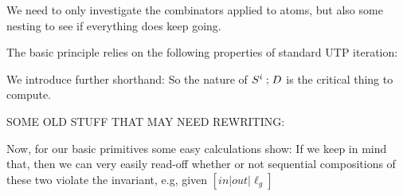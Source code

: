 \newpage
{}

We need to only investigate the combinators
applied to atoms, but also some nesting to see if everything
does keep going.

The basic principle relies on the following properties of
standard UTP iteration:

We introduce further shorthand:
So the nature of $S^i\mathrel{;} D$ is the critical thing to compute.


SOME OLD STUFF THAT MAY NEED REWRITING:

Now, for our basic primitives some easy calculations show:
If we keep in mind that,
then we can very easily read-off whether or not sequential compositions
of these two violate the invariant, e.g, given $[in|out|\ell_g]$
